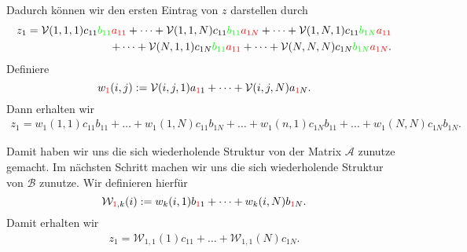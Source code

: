 Dadurch können wir den ersten Eintrag von $z$ darstellen durch
\begin{equation*} \label{eq:zold}
\begin{aligned}
z_{1} = \mathcal{V}(1,1,1) c_{11} \textcolor{green}{b_{11}} \textcolor{red}{a_{11}}+ \dots +  \mathcal{V}(1,1,N) c_{11} \textcolor{green}{b_{11}} \textcolor{red}{a_{1N}} + \dots  +  \mathcal{V}(1,N,1)c_{11} 
\textcolor{green}{b_{1N}} \textcolor{red}{a_{11}} \\ + \dots +  \mathcal{V}(N,1,1) c_{1N} \textcolor{green}{b_{11}} \textcolor{red}{a_{11}} + \dots +  \mathcal{V}(N,N,N) c_{1N} \textcolor{green}{b_{1N}} \textcolor{red}{a_{1N}}.
\end{aligned}
\end{equation*}
Definiere $$w_{\textcolor{red}{1}}(i,j) :=\mathcal{V}(i,j,1) a_{\textcolor{red}{1}1}+\dots+\mathcal{V}(i,j,N) a_{\textcolor{red}{1}N}.$$ Dann erhalten wir
\begin{equation*}
\begin{aligned}
z_{1}= w_1(1,1) c_{11} b_{11} + \dots +   w_1(1,N) c_{11} b_{1N} + \dots + w_1(n,1) c_{1N} b_{11}  + \dots +  w_1(N,N) c_{1N} b_{1N}.
\end{aligned}
\end{equation*}

Damit haben wir uns die sich wiederholende Struktur von der Matrix $\mathcal{A}$ zunutze gemacht. Im nächsten Schritt machen wir uns die sich wiederholende Struktur von $\mathcal{B}$ zunutze.
Wir definieren hierfür $$\mathcal{W}_{\textcolor{red}{1},k} (i):= w_k(i,1) b_{\textcolor{red}{1}1} + \dots + w_k(i,N) b_{\textcolor{red}{1}N}.$$ Damit erhalten wir
\begin{equation*} \label{eq:znew}
\begin{aligned}
z_{1}= \mathcal{W}_{1,1}(1) c_{11}  + \dots +  \mathcal{W}_{1,1}(N) c_{1N}.
\end{aligned}
\end{equation*}

